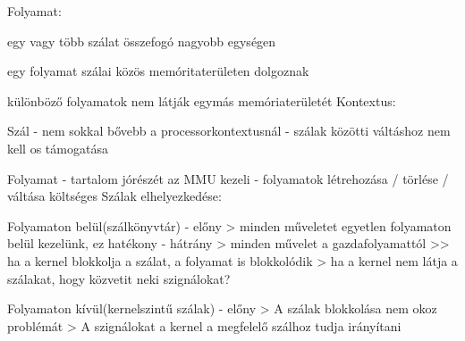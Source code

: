 \documentclass[twoside, a4paper, 12pt]{article}
\begin{document}
\begin{description}
                                                                        Folyamat:
                                                                    \item egy vagy több szálat összefogó nagyobb egységen
                                                                    \item egy folyamat szálai közös memóritaterületen dolgoznak
                                                                    \item különböző folyamatok nem látják egymás memóriaterületét
                                                                        Kontextus:
                                                                    \item Szál
                                                                        - nem sokkal bővebb a processorkontextusnál
                                                                        - szálak közötti váltáshoz nem kell os támogatása
                                                                    \item Folyamat
                                                                        - tartalom jórészét az MMU kezeli
                                                                        - folyamatok létrehozása / törlése / váltása költséges 
                                                                        Szálak elhelyezkedése:
                                                                    \item Folyamaton belül(szálkönyvtár)
                                                                        - előny
                                                                        > minden műveletet egyetlen folyamaton belül kezelünk, ez hatékony
                                                                        - hátrány
                                                                        > minden művelet a gazdafolyamattól >> ha a kernel blokkolja a szálat, a folyamat is blokkolódik
                                                                        > ha a kernel nem látja a szálakat, hogy közvetit neki szignálokat?
                                                                    \item Folyamaton kívül(kernelszintű szálak)
                                                                        - előny
                                                                        > A szálak blokkolása nem okoz problémát
                                                                        > A szignálokat a kernel a megfelelő szálhoz tudja irányítani

\end{description}
\end{document}
